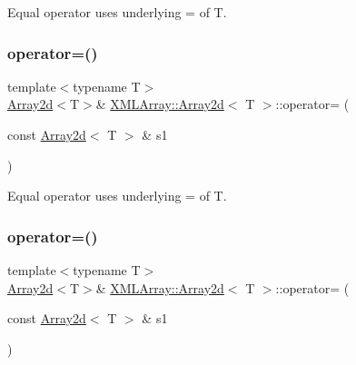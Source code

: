 Equal operator uses underlying = of T. 

\mbox{\label{classXMLArray_1_1Array2d_a9fafd7ae228834d56b08fb5b1485eba4}} 
\subsubsection{\texorpdfstring{operator=()}{operator=()}\hspace{0.1cm}{\footnotesize\ttfamily [2/6]}}
{\footnotesize\ttfamily template$<$typename T$>$ \\
\mbox{\hyperlink{classXMLArray_1_1Array2d}{Array2d}}$<$T$>$\& \mbox{\hyperlink{classXMLArray_1_1Array2d}{X\+M\+L\+Array\+::\+Array2d}}$<$ T $>$\+::operator= (\begin{DoxyParamCaption}\item[{const \mbox{\hyperlink{classXMLArray_1_1Array2d}{Array2d}}$<$ T $>$ \&}]{s1 }\end{DoxyParamCaption})\hspace{0.3cm}{\ttfamily [inline]}}



Equal operator uses underlying = of T. 

\mbox{\label{classXMLArray_1_1Array2d_a9fafd7ae228834d56b08fb5b1485eba4}} 
\subsubsection{\texorpdfstring{operator=()}{operator=()}\hspace{0.1cm}{\footnotesize\ttfamily [3/6]}}
{\footnotesize\ttfamily template$<$typename T$>$ \\
\mbox{\hyperlink{classXMLArray_1_1Array2d}{Array2d}}$<$T$>$\& \mbox{\hyperlink{classXMLArray_1_1Array2d}{X\+M\+L\+Array\+::\+Array2d}}$<$ T $>$\+::operator= (\begin{DoxyParamCaption}\item[{const \mbox{\hyperlink{classXMLArray_1_1Array2d}{Array2d}}$<$ T $>$ \&}]{s1 }\end{DoxyParamCaption})\hspace{0.3cm}{\ttfamily [inline]}}



